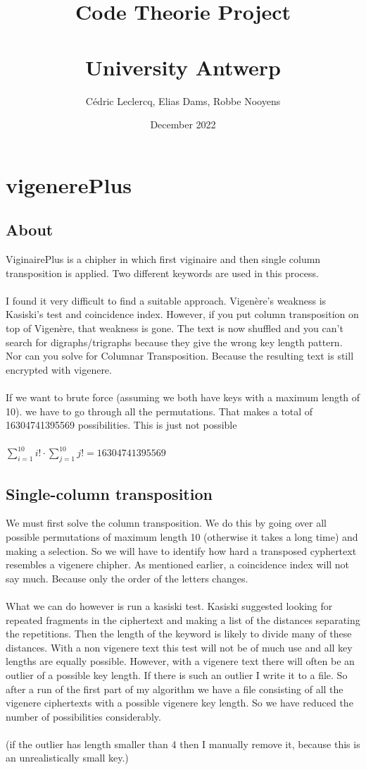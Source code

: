 \documentclass{article}
\title{Code Theorie Project\\\\ University Antwerp}
\author{Cédric Leclercq, Elias Dams, Robbe Nooyens}
\date{December 2022}
\begin{document}
\maketitle

\tableofcontents

\newpage

\section{vigenerePlus}
\subsection{About}
ViginairePlus is a chipher in which first viginaire and then single column transposition is applied. Two different keywords are used in this process.\\
\\
I found it very difficult to find a suitable approach. Vigenère's weakness is Kasiski's test and coincidence index. However, if you put column transposition on top of Vigenère, that weakness is gone. The text is now shuffled and you can't search for digraphs/trigraphs because they give the wrong key length pattern. Nor can you solve for Columnar Transposition. Because the resulting text is still encrypted with vigenere.\\
\\
If we want to brute force (assuming we both have keys with a maximum length of 10). we have to go through all the permutations. That makes a total of 16304741395569 possibilities. This is just not possible\\
\\
$\sum_{i=1}^{10} i! \cdot \sum_{j=1}^{10} j! = 16304741395569$\\
\subsection{Single-column transposition}
We must first solve the column transposition. We do this by going over all possible permutations of maximum length 10 (otherwise it takes a long time) and making a selection. So we will have to identify how hard a transposed cyphertext resembles a vigenere chipher. As mentioned earlier, a coincidence index will not say much. Because only the order of the letters changes.\\
\\
What we can do however is run a kasiski test. Kasiski suggested looking for repeated fragments in the ciphertext and making a list of the distances separating the repetitions. Then the length of the keyword is likely to divide many of these distances. With a non vigenere text this test will not be of much use and all key lengths are equally possible. However, with a vigenere text there will often be an outlier of a possible key length. If there is such an outlier I write it to a file. So after a run of the first part of my algorithm we have a file consisting of all the vigenere ciphertexts with a possible vigenere key length. So we have reduced the number of possibilities considerably.\\
\\
(if the outlier has length smaller than 4 then I manually remove it, because this is an unrealistically small key.)
\newpage
\end{document}
